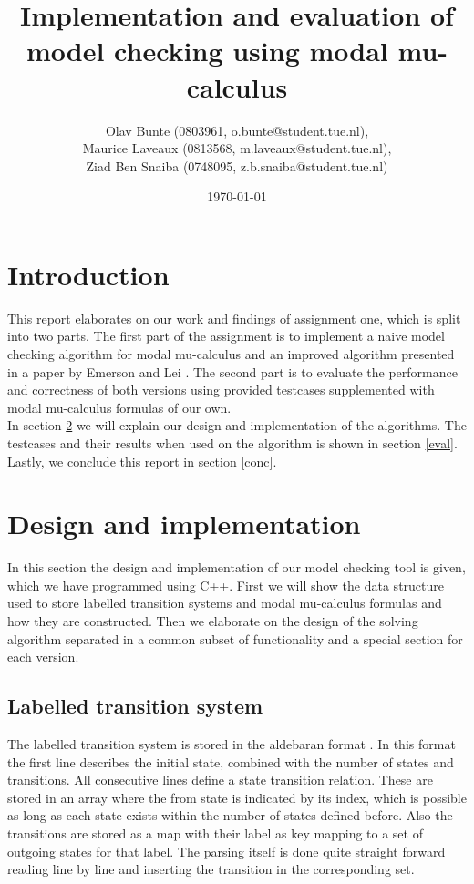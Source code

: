 \documentclass[10pt,a4paper]{article}
\title{Implementation and evaluation of model checking using modal mu-calculus}
\author{Olav Bunte (0803961, o.bunte@student.tue.nl),\\
Maurice Laveaux (0813568, m.laveaux@student.tue.nl),\\
Ziad Ben Snaiba (0748095, z.b.snaiba@student.tue.nl)}
\date{\today}
\begin{document}
\maketitle

\section{Introduction}
This report elaborates on our work and findings of assignment one, which is split into two parts. The first part of the assignment is to implement a naive model checking algorithm for modal mu-calculus and an improved algorithm presented in a paper by Emerson and Lei \cite{elpaper}. The second part is to evaluate the performance and correctness of  both versions using provided testcases supplemented with modal mu-calculus formulas of our own.\\
In section \ref{design} we will explain our design and implementation of the algorithms. The testcases and their results when used on the algorithm is shown in section \ref{eval}. Lastly, we conclude this report in section \ref{conc}.

\section{Design and implementation}\label{design}
In this section the design and implementation of our model checking tool is given, which we have programmed using C++. First we will show the data structure used to store labelled transition systems and modal mu-calculus formulas and how they are constructed. Then we elaborate on the design of the solving algorithm separated in a common subset of functionality and a special section for each version.

\subsection{Labelled transition system}
The labelled transition system is stored in the aldebaran format \cite{aldebaran}. In this format the first line describes the initial state, combined with the number of states and transitions. All consecutive lines define a state transition relation. These are stored in an array where the from state is indicated by its index, which is possible as long as each state exists within the number of states defined before. Also the transitions are stored as a map with their label as key mapping to a set of outgoing states for that label. The parsing itself is done quite straight forward reading line by line and inserting the transition in the corresponding set.
\end{document}
